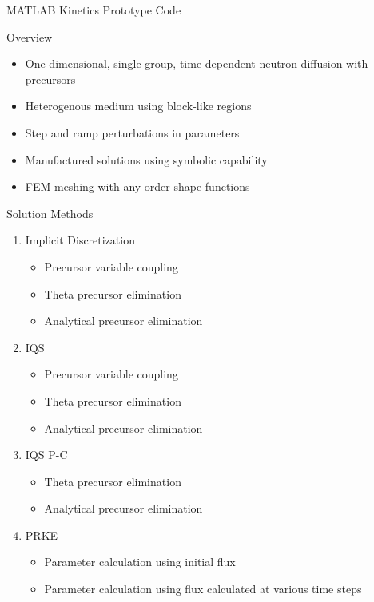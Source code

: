 \documentclass[8pt,xcolor=dvipnames]{beamer}
\begin{document}
\begin{frame}{MATLAB Kinetics Prototype Code}

\begin{block}{Overview}
\begin{itemize}
\item One-dimensional, single-group, time-dependent neutron diffusion with precursors
\item Heterogenous medium using block-like regions
\item Step and ramp perturbations in parameters
\item Manufactured solutions using symbolic capability
\item FEM meshing with any order shape functions
\end{itemize}
\end{block}

\begin{block}{Solution Methods}
\begin{multicols}{2}
\begin{enumerate}
\item Implicit Discretization
\begin{itemize}
\item Precursor variable coupling
\item Theta precursor elimination
\item Analytical precursor elimination
\end{itemize}
\item IQS
\begin{itemize}
\item Precursor variable coupling
\item Theta precursor elimination
\item Analytical precursor elimination
\end{itemize}
\item IQS P-C
\begin{itemize}
\item Theta precursor elimination
\item Analytical precursor elimination
\end{itemize}
\item PRKE
\begin{itemize}
\item Parameter calculation using initial flux
\item Parameter calculation using flux calculated at various time steps
\end{itemize}
\end{enumerate}
\end{multicols}
\end{block}

\end{frame}
\end{document}
